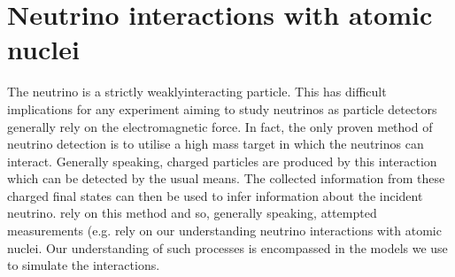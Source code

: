 \chapter{Neutrino interactions with atomic nuclei}
\label{chap:NeutrinoInteractionsAtomicNuclei}
The neutrino is a strictly weaklyinteracting particle.  This has difficult implications for any experiment aiming to study neutrinos as particle detectors generally rely on the electromagnetic force.  In fact, the only proven method of neutrino detection is to utilise a high mass target in which the neutrinos can interact.  Generally speaking, charged particles are produced by this interaction which can be detected by the usual means.  The collected information from these charged final states can then be used to infer information about the incident neutrino.   rely on this method and so, generally speaking, attempted measurements (e.g.  rely on our understanding  neutrino interactions with atomic nuclei.  Our understanding of such processes is encompassed in the models we use to simulate the interactions.

